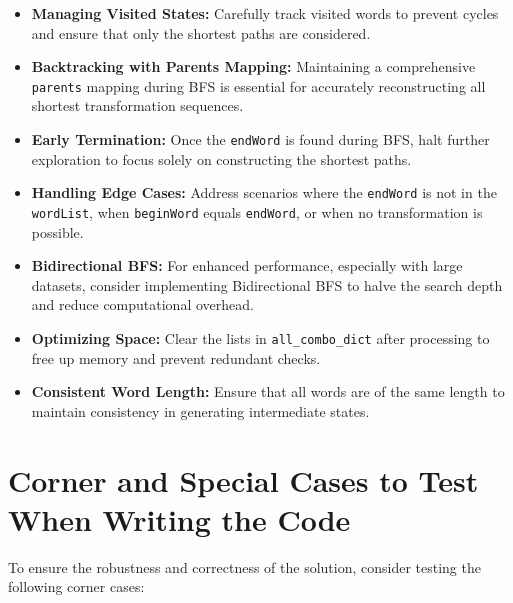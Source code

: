 \begin{itemize}
    \item \textbf{Managing Visited States:} Carefully track visited words to prevent cycles and ensure that only the shortest paths are considered.
    
    \item \textbf{Backtracking with Parents Mapping:} Maintaining a comprehensive \texttt{parents} mapping during BFS is essential for accurately reconstructing all shortest transformation sequences.
    
    \item \textbf{Early Termination:} Once the \texttt{endWord} is found during BFS, halt further exploration to focus solely on constructing the shortest paths.
    
    \item \textbf{Handling Edge Cases:} Address scenarios where the \texttt{endWord} is not in the \texttt{wordList}, when \texttt{beginWord} equals \texttt{endWord}, or when no transformation is possible.
    
    \item \textbf{Bidirectional BFS:} For enhanced performance, especially with large datasets, consider implementing Bidirectional BFS to halve the search depth and reduce computational overhead.
    
    \item \textbf{Optimizing Space:} Clear the lists in \texttt{all\_combo\_dict} after processing to free up memory and prevent redundant checks.
    
    \item \textbf{Consistent Word Length:} Ensure that all words are of the same length to maintain consistency in generating intermediate states.
\end{itemize}

\section*{Corner and Special Cases to Test When Writing the Code}

To ensure the robustness and correctness of the solution, consider testing the following corner cases:

